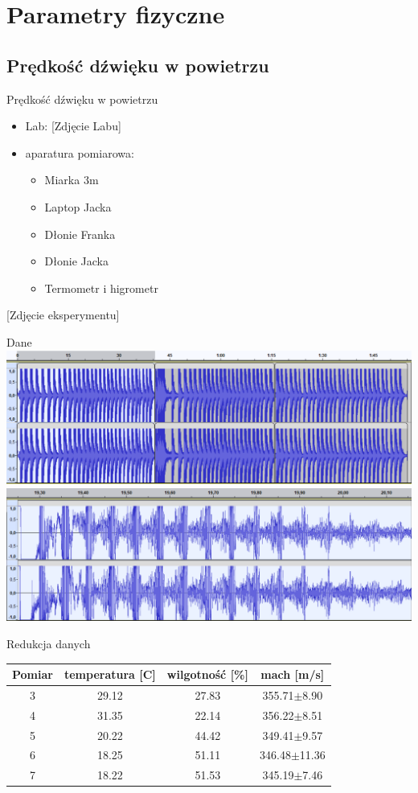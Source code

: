 \documentclass{beamer}
\begin{document}
\section{Parametry fizyczne}

\subsection{Prędkość dźwięku w powietrzu}

\begin{frame}{Prędkość dźwięku w powietrzu}
\begin{itemize}
\item Lab: [Zdjęcie Labu]
\item aparatura pomiarowa:
	\begin{itemize}
		\item Miarka $3$m
		\item Laptop Jacka
		\item Dłonie Franka
		\item Dłonie Jacka
		\item Termometr i higrometr
	\end{itemize}
\end{itemize}
[Zdjęcie eksperymentu]
\end{frame}

\begin{frame}{Dane}
\includegraphics[width=\linewidth]{Data.png}
\includegraphics[width=\linewidth]{Data_zoom.png}
\end{frame}

\begin{frame}{Redukcja danych}
\centering
\begin{tabular}{cccc}
\toprule
Pomiar & temperatura [C] & wilgotność [\%]  & mach [m/s]\\
\midrule
3 & 29.12 & 27.83 & 355.71$\pm$8.90 \\
4 & 31.35 & 22.14 & 356.22$\pm$8.51 \\
5 & 20.22 & 44.42 & 349.41$\pm$9.57 \\
6 & 18.25 & 51.11 & 346.48$\pm$11.36 \\
7 & 18.22 & 51.53 & 345.19$\pm$7.46 \\
\bottomrule
\end{tabular}


\end{frame}
\end{document}

